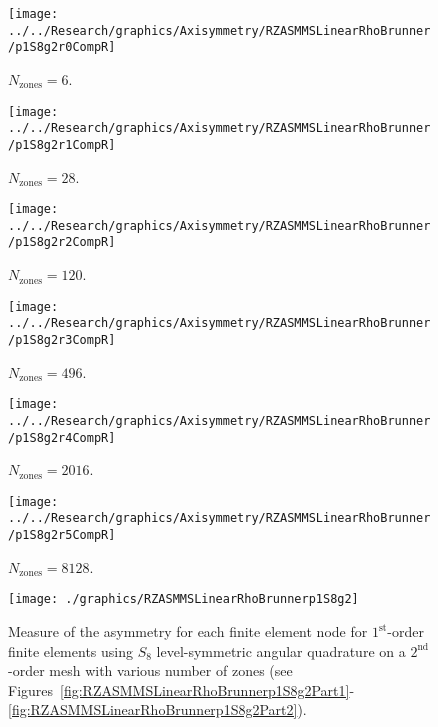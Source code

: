 \documentclass[12pt]{article}
\begin{document}
\begin{sidewaysfigure}[!htb]
\centering
\begin{subfigure}{0.33\textwidth}
\texttt{[image: ../../Research/graphics/Axisymmetry/RZASMMSLinearRhoBrunner/p1S8g2r0CompR]}
\caption{$N_\text{zones}=6$.}
\end{subfigure}%
\begin{subfigure}{0.33\textwidth}
\texttt{[image: ../../Research/graphics/Axisymmetry/RZASMMSLinearRhoBrunner/p1S8g2r1CompR]}
\caption{$N_\text{zones}=28$.}
\end{subfigure}%
\begin{subfigure}{0.33\textwidth}
\texttt{[image: ../../Research/graphics/Axisymmetry/RZASMMSLinearRhoBrunner/p1S8g2r2CompR]}
\caption{$N_\text{zones}=120$.}
\end{subfigure}
\caption{Relative asymmetry for $p=1$ finite elements on a $2^\text{nd}$-order mesh for $S_8$ level-symmetric angular quadrature.}
\label{fig:RZASMMSLinearRhoBrunnerp1S8g2Part1}
\end{sidewaysfigure}

\begin{sidewaysfigure}[!htb]
\centering
\begin{subfigure}{0.33\textwidth}
\texttt{[image: ../../Research/graphics/Axisymmetry/RZASMMSLinearRhoBrunner/p1S8g2r3CompR]}
\caption{$N_\text{zones}=496$.}
\end{subfigure}%
\begin{subfigure}{0.33\textwidth}
\texttt{[image: ../../Research/graphics/Axisymmetry/RZASMMSLinearRhoBrunner/p1S8g2r4CompR]}
\caption{$N_\text{zones}=2016$.}
\end{subfigure}%
\begin{subfigure}{0.33\textwidth}
\texttt{[image: ../../Research/graphics/Axisymmetry/RZASMMSLinearRhoBrunner/p1S8g2r5CompR]}
\caption{$N_\text{zones}=8128$.}
\end{subfigure}
\caption{Relative asymmetry for $p=1$ finite elements on a $2^\text{nd}$-order mesh for $S_8$ level-symmetric angular quadrature; mesh overlay may be removed for clarity.}
\label{fig:RZASMMSLinearRhoBrunnerp1S8g2Part2}
\end{sidewaysfigure}

\begin{figure}[!htb]
\centering
\texttt{[image: ./graphics/RZASMMSLinearRhoBrunnerp1S8g2]}
\caption{Measure of the asymmetry for each finite element node for $1^\text{st}$-order finite elements using $S_8$ level-symmetric angular quadrature on a $2^\text{nd}$-order mesh with various number of zones (see Figures~\ref{fig:RZASMMSLinearRhoBrunnerp1S8g2Part1}-\ref{fig:RZASMMSLinearRhoBrunnerp1S8g2Part2}).}
\label{fig:RZASMMSLinearRhoBrunnerp1S8g2Nodes}
\end{figure}
\end{document}
